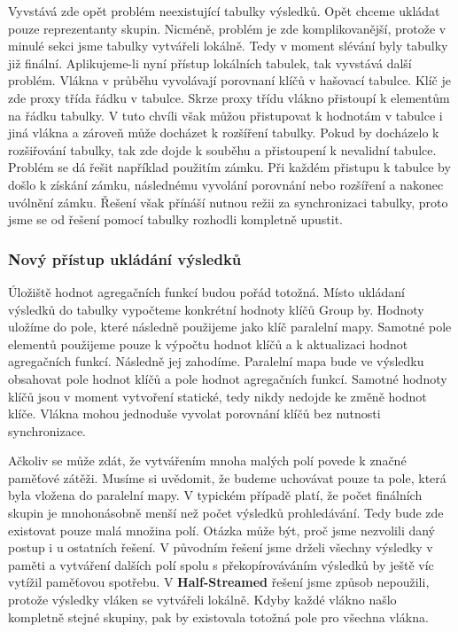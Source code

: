 Vyvstává zde opět problém neexistující tabulky výsledků.
Opět chceme ukládat pouze reprezentanty skupin.
Nicméně, problém je zde komplikovanější, protože v minulé sekci jsme tabulky vytvářeli lokálně.
Tedy v moment slévání byly tabulky již finální. 
Aplikujeme-li nyní přístup lokálních tabulek, tak vyvstává další problém.
Vlákna v průběhu vyvolávají porovnaní klíčů v hašovací tabulce.
Klíč je zde proxy třída řádku v tabulce.
Skrze proxy třídu vlákno přistoupí k elementům na řádku tabulky.
V tuto chvíli však můžou přistupovat k hodnotám v tabulce i jiná vlákna a zároveň může docházet k rozšíření tabulky.
Pokud by docházelo k rozšiřování tabulky, tak zde dojde k souběhu a přistoupení k nevalidní tabulce.
Problém se dá řešit například použitím zámku.
Při každém přistupu k tabulce by došlo k získání zámku, následnému vyvolání porovnání nebo rozšíření a nakonec uvólnění zámku.
Řešení však přínáší nutnou režii za synchronizaci tabulky, proto jsme se od řešení pomocí tabulky rozhodli kompletně upustit.

\subsubsection{Nový přístup ukládání výsledků}

Úložiště hodnot agregačních funkcí budou pořád totožná.
Místo ukládaní výsledků do tabulky vypočteme konkrétní hodnoty klíčů Group by.
Hodnoty uložíme do pole, které následně použijeme jako klíč paralelní mapy.  
Samotné pole elementů použijeme pouze k výpočtu hodnot klíčů a k aktualizaci hodnot agregačních funkcí.
Následně jej zahodíme.
Paralelní mapa bude ve výsledku obsahovat pole hodnot klíčů a pole hodnot agregačních funkcí.
Samotné hodnoty klíčů jsou v moment vytvoření statické, tedy nikdy nedojde ke změně hodnot klíče.
Vlákna mohou jednoduše vyvolat porovnání klíčů bez nutnosti synchronizace.

Ačkoliv se může zdát, že vytvářením mnoha malých polí povede k značné paměťové zátěži.
Musíme si uvědomit, že budeme uchovávat pouze ta pole, která byla vložena do paralelní mapy.
V typickém případě platí, že počet finálních skupin je mnohonásobně menší než počet výsledků prohledávání.
Tedy bude zde existovat pouze malá množina polí.
Otázka může být, proč jsme nezvolili daný postup i u ostatních řešení.
V původním řešení jsme drželi všechny výsledky v paměti a vytváření dalších polí spolu s překopírováváním výsledků by ještě víc vytížil paměťovou spotřebu.
V \textbf{Half-Streamed} řešení jsme způsob nepoužili, protože výsledky vláken se vytvářeli lokálně.
Kdyby každé vlákno našlo kompletně stejné skupiny, pak by existovala totožná pole pro všechna vlákna.

